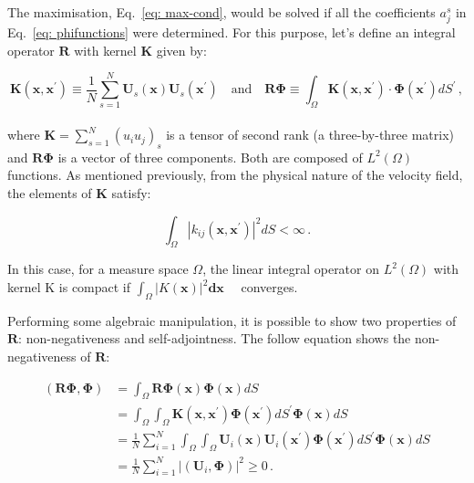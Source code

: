 \documentclass[10pt,fleqn,a4paper]{article}
\newcommand{\bv}[1]{\mathbf{#1}}
\newcommand{\xp}{x^{\mathbf{\prime}}}
\begin{document}
The maximisation, Eq.~\eqref{eq: max-cond}, would be solved if all the coefficients $a^{s}_{j}$ in Eq.~\eqref{eq: phifunctions} were determined. For this purpose, let's define an integral operator $\bv{R}$ with kernel $\bv{K}$ given by:


\begin{equation}\label{KandR}
 \bv{K} (\bv{x}, \bv{x}^{\prime}) \equiv \frac{1}{N} \sum_{s=1}^{N} \bv{U}_s (\bv{x}) \bv{U}_s (\bv{\xp}) \quad \text{and} \quad \bv{R} \bv{\Phi} \equiv \int_{\Omega} \bv{K} (\bv{x}, \bv{x}^{\prime}) \cdot \bv{\Phi}(\bv{x}^{\prime}) dS^{\prime} \,,
\end{equation}
\\
where $\bv{K}=\sum_{s=1}^{N} (u_i u_j)_s$ is a tensor of second rank (a three-by-three matrix) and $\bv{R} \bv{\Phi}$ is a vector of three components. Both are composed of $L^2(\Omega)$ functions. As mentioned previously, from the physical nature of the velocity field, the elements of $\bv{K}$ satisfy:


\begin{equation}\label{eq: kernel}
 \int_{\Omega} | k_{ij} (\bv{x},\bv{\xp}) |^{2} dS < \infty \,.
\end{equation}


In this case, for a measure space $\Omega$, the linear integral operator on $L^{2}(\Omega)$ with kernel K is compact if $\int_{\Omega} | K( \bv{x})|^2 \bv{dx} \quad$ converges.  

Performing some algebraic manipulation, it is possible to show two properties of $\bv{R}$: non-negativeness and self-adjointness. The follow equation shows the non-negativeness of $\bv{R}$:


\begin{equation}\label{st1}
 \begin{split}
 (\bv{R}\bv{\Phi},\bv{\Phi}) &= \int_{\Omega} \bv{R}\bv{\Phi}(\bv{x}) \bv{\Phi}(\bv{x}) dS \\
 &= \int_{\Omega} \int_{\Omega} \bv{K}(\bv{x},\bv{\xp}) \bv{\Phi}(\bv{\xp}) dS^{\prime} \bv{\Phi}(\bv{x}) dS \\
 &= \frac{1}{N} \sum_{i=1}^{N} \int_{\Omega} \int_{\Omega} \bv{U}_{i}(\bv{x}) \bv{U}_{i}(\bv{\xp}) \bv{\Phi}(\bv{\xp}) dS^{\prime} \bv{\Phi}(\bv{x}) dS \\
 &= \frac{1}{N} \sum_{i=1}^{N} | \left(\bv{U}_{i} , \bv{\Phi}\right) |^2 \ge 0 \,.
 \end{split}
\end{equation}
\end{document}
